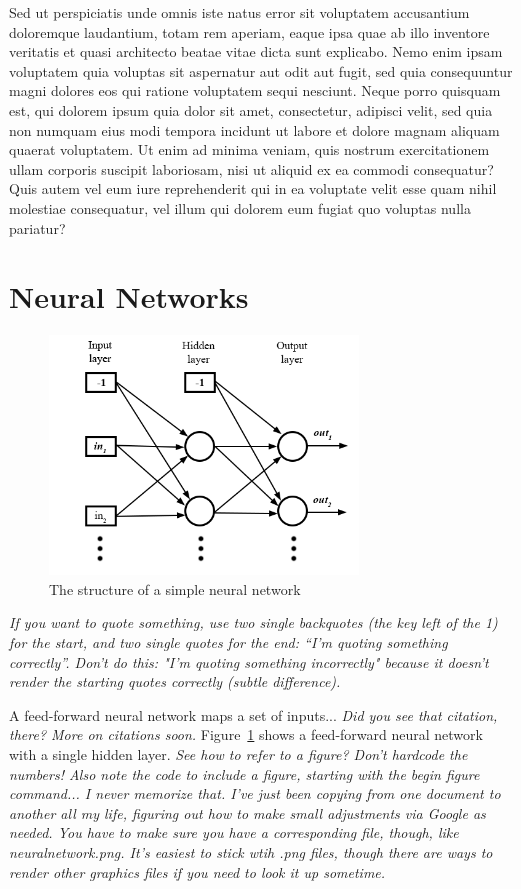 \documentclass[twocolumn,letterpaper,10pt]{article}
\begin{document}
Sed ut perspiciatis unde omnis iste natus error sit voluptatem accusantium doloremque laudantium, totam rem aperiam, eaque ipsa quae ab illo inventore veritatis et quasi architecto beatae vitae dicta sunt explicabo. Nemo enim ipsam voluptatem quia voluptas sit aspernatur aut odit aut fugit, sed quia consequuntur magni dolores eos qui ratione voluptatem sequi nesciunt. Neque porro quisquam est, qui dolorem ipsum quia dolor sit amet, consectetur, adipisci velit, sed quia non numquam eius modi tempora incidunt ut labore et dolore magnam aliquam quaerat voluptatem. Ut enim ad minima veniam, quis nostrum exercitationem ullam corporis suscipit laboriosam, nisi ut aliquid ex ea commodi consequatur? Quis autem vel eum iure reprehenderit qui in ea voluptate velit esse quam nihil molestiae consequatur, vel illum qui dolorem eum fugiat quo voluptas nulla pariatur?

\section{Neural Networks}
\label{sec:NN}

\begin{figure}
\begin{center}
\includegraphics[width=.95\linewidth,height=2.5in]{neuralnetwork.png}
\end{center}
\caption{The structure of a simple neural network}
\label{fig:NN}
\end{figure}

{\it If you want to quote something, use two single backquotes (the key left of the 1) for the start, and two single quotes for the end: ``I'm quoting something correctly''. Don't do this: "I'm quoting something incorrectly" because it doesn't render the starting quotes correctly (subtle difference).}

A feed-forward neural network \cite{AImodern} maps a set of inputs... {\it Did you see that citation, there? More on citations soon.} Figure~\ref{fig:NN} shows a feed-forward neural network with a single hidden layer. {\it See how to refer to a figure? Don't hardcode the numbers! Also note the code to include a figure, starting with the begin figure command... I never memorize that. I've just been copying from one document to another all my life, figuring out how to make small adjustments via Google as needed. You have to make sure you have a corresponding file, though, like neuralnetwork.png. It's easiest to stick wtih .png files, though there are ways to render other graphics files if you need to look it up sometime.}
\end{document}
